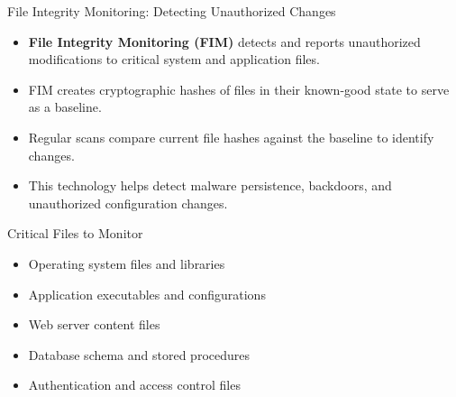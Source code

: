 \documentclass{beamer}
\begin{document}
                    \begin{frame}{File Integrity Monitoring: Detecting Unauthorized Changes}
                    \begin{itemize}
                        \item \textbf{File Integrity Monitoring (FIM)} detects and reports unauthorized modifications to critical system and application files.
                        \item FIM creates cryptographic hashes of files in their known-good state to serve as a baseline.
                        \item Regular scans compare current file hashes against the baseline to identify changes.
                        \item This technology helps detect malware persistence, backdoors, and unauthorized configuration changes.
                    \end{itemize}
                    
                    \begin{alertblock}{Critical Files to Monitor}
                    \begin{itemize}
                        \item Operating system files and libraries
                        \item Application executables and configurations
                        \item Web server content files
                        \item Database schema and stored procedures
                        \item Authentication and access control files
                    \end{itemize}
                    \end{alertblock}
                    \end{frame}
\end{document}
